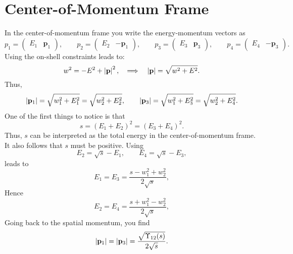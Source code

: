 \section{Center-of-Momentum Frame}
In the center-of-momentum frame you write the energy-momentum vectors as
\begin{equation}
	p_{1} = \begin{pmatrix} E_{1} & \mathbf{p}_{1} \end{pmatrix}, \qquad p_{2} = \begin{pmatrix} E_{2} & -\mathbf{p}_{1} \end{pmatrix}, \qquad p_{3} = \begin{pmatrix} E_{3} & \mathbf{p}_{3} \end{pmatrix}, \qquad p_{4} = \begin{pmatrix} E_{4} & -\mathbf{p}_{3} \end{pmatrix}.
\end{equation}
Using the on-shell constraints leads to:
\begin{equation}
	w^{2} = -E^{2} + \left\lvert \mathbf{p} \right\rvert^{2}, \quad \Longrightarrow \quad \left\lvert \mathbf{p} \right\rvert = \sqrt{w^{2} + E^{2}}.
\end{equation}
Thus,
\begin{equation}
	\left\lvert \mathbf{p}_{1} \right\rvert = \sqrt{w_{1}^{2} + E_{1}^{2}} = \sqrt{w_{2}^{2} + E_{2}^{2}}, \qquad \left\lvert \mathbf{p}_{3} \right\rvert = \sqrt{w_{1}^{2} + E_{3}^{2}} = \sqrt{w_{2}^{2} + E_{4}^{2}}.
\end{equation}
One of the first things to notice is that
\begin{equation}
	s = (E_{1} + E_{2})^{2} = (E_{3} + E_{4})^{2}.
\end{equation}
Thus, $s$ can be interpreted as the total energy in the center-of-momentum frame. It also follows that $s$ must be positive. Using
\begin{equation}
	E_{2} = \sqrt{s} - E_{1}, \qquad E_{4} = \sqrt{s} - E_{3},
\end{equation}
leads to
\begin{equation}
	E_{1} = E_{3} = \frac{s - w_{1}^{2} + w_{2}^{2}}{2 \sqrt{s}},
\end{equation}
Hence
\begin{equation}
	E_{2} = E_{4} = \frac{s + w_{1}^{2} - w_{2}^{2}}{2 \sqrt{s}},
\end{equation}
Going back to the spatial momentum, you find
\begin{equation}
	\left\lvert \mathbf{p}_{1} \right\rvert = \left\lvert \mathbf{p}_{3} \right\rvert = \frac{\sqrt{\Upsilon_{12}(s)}}{2 \sqrt{s}}.
\end{equation}
